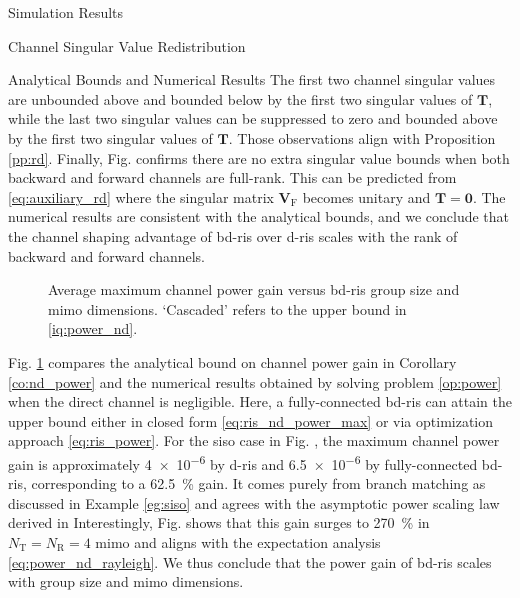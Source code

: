 \documentclass[journal]{IEEEtran}
\begin{document}
\begin{section}{Simulation Results}
\begin{subsection}{Channel Singular Value Redistribution}
\begin{subsubsection}{Analytical Bounds and Numerical Results}
			The first two channel singular values are unbounded above and bounded below by the first two singular values of $\mathbf{T}$, while the last two singular values can be suppressed to zero and bounded above by the first two singular values of $\mathbf{T}$.
			Those observations align with Proposition \ref{pp:rd}.
			Finally, Fig.  confirms there are no extra singular value bounds when both backward and forward channels are full-rank.
			This can be predicted from \eqref{eq:auxiliary_rd} where the singular matrix $\mathbf{V}_\mathrm{F}$ becomes unitary and $\mathbf{T}=\mathbf{0}$.
			The numerical results are consistent with the analytical bounds, and we conclude that the channel shaping advantage of \gls{bd}-\gls{ris} over \gls{d}-\gls{ris} scales with the rank of backward and forward channels.

			\begin{figure}[!t]
				\centering
				\caption{
					Average maximum channel power gain versus \gls{bd}-\gls{ris} group size and \gls{mimo} dimensions.
					`Cascaded' refers to the upper bound in \eqref{iq:power_nd}.
				}
				\label{fg:power_bond}
			\end{figure}

			Fig. \ref{fg:power_bond} compares the analytical bound on channel power gain in Corollary \ref{co:nd_power} and the numerical results obtained by solving problem \eqref{op:power} when the direct channel is negligible.
			Here, a fully-connected \gls{bd}-\gls{ris} can attain the upper bound either in closed form \eqref{eq:ris_nd_power_max} or via optimization approach \eqref{eq:ris_power}.
			For the \gls{siso} case in Fig. , the maximum channel power gain is approximately \num{4e-6} by \gls{d}-\gls{ris} and \num{6.5e-6} by fully-connected \gls{bd}-\gls{ris}, corresponding to a \qty{62.5}{\percent} gain.
			It comes purely from branch matching as discussed in Example \ref{eg:siso} and agrees with the asymptotic power scaling law derived in \cite[(30)]{Shen2020a}
			Interestingly, Fig.  shows that this gain surges to \qty{270}{\percent} in $N_\mathrm{T}=N_\mathrm{R}=4$ \gls{mimo} and aligns with the expectation analysis \eqref{eq:power_nd_rayleigh}.
			We thus conclude that the power gain of \gls{bd}-\gls{ris} scales with group size and \gls{mimo} dimensions.
		\end{subsubsection}
	\end{subsection}


\end{section}
\end{document}
